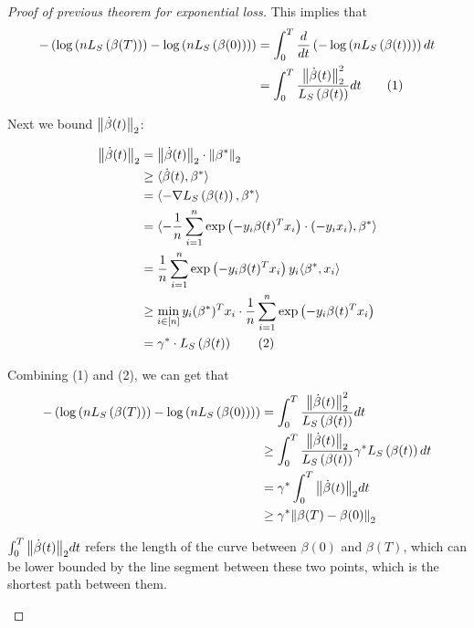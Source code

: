 \begin{proof}[Proof of previous theorem for exponential loss]
    This implies that 
    \begin{align*}
        - \left(  \log \left( n L_S \left(\beta(T)\right) \right) - \log \left(n L_S \left(\beta(0)\right)\right)  \right)
        &= \int_0^T \frac{d}{dt} \left(- \log \left(n L_S \left(\beta (t)\right)\right)\right) dt \\ 
        &= \int^T_0 \frac{\norm{\dot{\beta} (t)}_2^2}{L_S \left(\beta(t)\right)} dt  \tag{1}
    \end{align*} 

    Next we bound \(\norm{\dot{\beta} (t)}_2\): 

    \begin{align*}
        \norm{\dot{\beta} (t)}_2 &= \norm{  \dot{\beta} (t)  }_2 \cdot \norm{\beta^*}_2 \\ 
        & \geq \langle \dot{\beta} (t), \beta^* \rangle \\ 
        &= \langle  - \nabla L_S \left(\beta(t)\right) , \beta^* \rangle \\ 
        &= \langle - \frac{1}{n} \sum_{i=1}^n \exp \left(- y_i \beta(t)^T x_i\right) \cdot (-y_i x_i), \beta^* \rangle \\ 
        &=   \frac{1}{n} \sum_{i=1}^n \exp \left(- y_i \beta(t)^T x_i\right) y_i \langle \beta^* , x_i \rangle \\ 
        &\geq \min_{i \in [n]} y_i (\beta^*)^T x_i \cdot \frac{1}{n} \sum_{i=1}^n \exp \left( -y_i \beta(t)^T x_i \right) \\ 
        &= \gamma^* \cdot L_S \left( \beta (t)\right) \tag{2}
    \end{align*}

    Combining (1) and (2), we can get that 
    \begin{align*}
        - \left(  \log \left( n L_S \left(\beta(T)\right) \right) - \log \left(n L_S \left(\beta(0)\right)\right)  \right) 
        &= \int^T_0 \frac{\norm{\dot{\beta} (t)}_2^2}{L_S \left(\beta(t)\right)} dt  \\ 
        &\geq \int^T_0 \frac{  \norm{\dot{\beta} (t)}_2  }{L_S \left(\beta(t)\right)} \gamma^* L_S \left(\beta(t)\right) dt \\ 
        &= \gamma^* \int_0^T \norm{\dot{\beta} (t)}_2 dt  \\ 
        &\geq \gamma^* \norm{\beta(T) - \beta(0)}_2 
    \end{align*}

    \begin{remark}
        \(\int_0^T \norm{\dot{\beta} (t)}_2 dt \) refers the length of the curve between \(\beta(0)\) and 
        \(\beta(T)\), which can be lower bounded by the line segment between these two points, which is the 
        shortest path between them. 
    \end{remark}


\end{proof}
